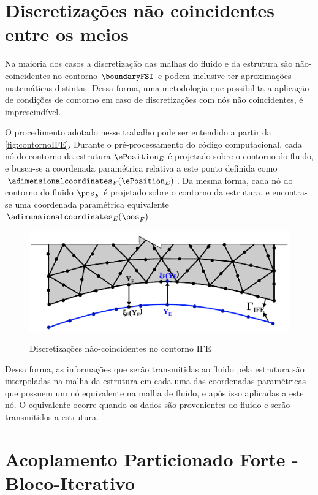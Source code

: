 \section{Discretizações não coincidentes entre os meios}

Na maioria dos casos a discretização das malhas do fluido e da estrutura são não-coincidentes no contorno $\boundaryFSI$ e podem inclusive ter aproximações matemáticas distintas. Dessa forma, uma metodologia que possibilita a aplicação de condições de contorno em caso de discretizações com nós não coincidentes, é imprescindível. 

O procedimento adotado nesse trabalho pode ser entendido a partir da \autoref{fig:contornoIFE}. Durante o pré-processamento do código computacional, cada nó do contorno da estrutura $\ePosition_E$ é projetado sobre o contorno do fluido, e busca-se a coordenada paramétrica relativa a este ponto definida como $\adimensionalcoordinates_F (\ePosition_E)$. Da mesma forma, cada nó do contorno do fluido $\pos_F$ é projetado sobre o contorno da estrutura, e encontra-se uma coordenada paramétrica equivalente $\adimensionalcoordinates_E(\pos_F)$. 

\begin{figure}[!htbp]
	\caption{Discretizações não-coincidentes no contorno IFE}
	\centering 
	\includegraphics[scale=1.5,trim=0cm 0cm 0cm 0cm, clip=true]{Imagens/Cap7/contornoIFE.pdf}	
	\label{fig:contornoIFE}
\end{figure}

Dessa forma, as informações que serão transmitidas ao fluido pela estrutura são interpoladas na malha da estrutura em cada uma das coordenadas paramétricas que possuem um nó equivalente na malha de fluido, e após isso aplicadas a este nó. O equivalente ocorre quando os dados são provenientes do fluido e serão transmitidos a estrutura.

\section{Acoplamento Particionado Forte - Bloco-Iterativo}

